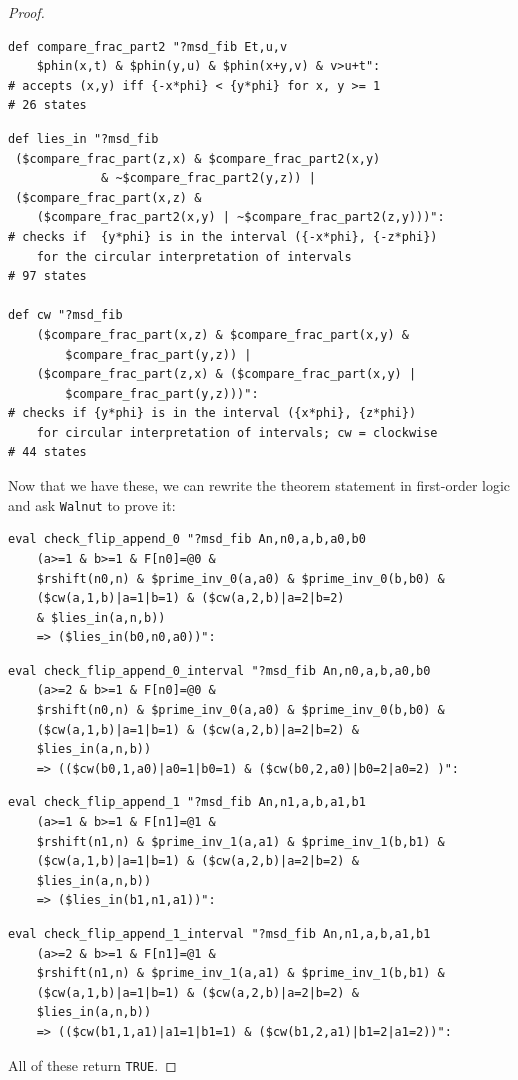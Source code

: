 \documentclass[10pt,a4paper]{amsart}
\begin{document}
\begin{proof}
\begin{verbatim}
def compare_frac_part2 "?msd_fib Et,u,v 
    $phin(x,t) & $phin(y,u) & $phin(x+y,v) & v>u+t":
# accepts (x,y) iff {-x*phi} < {y*phi} for x, y >= 1  
# 26 states
\end{verbatim}

\begin{verbatim}
def lies_in "?msd_fib  
 ($compare_frac_part(z,x) & $compare_frac_part2(x,y) 
             & ~$compare_frac_part2(y,z)) |
 ($compare_frac_part(x,z) & 
    ($compare_frac_part2(x,y) | ~$compare_frac_part2(z,y)))":
# checks if  {y*phi} is in the interval ({-x*phi}, {-z*phi}) 
    for the circular interpretation of intervals
# 97 states

def cw "?msd_fib 
    ($compare_frac_part(x,z) & $compare_frac_part(x,y) & 
        $compare_frac_part(y,z)) |
    ($compare_frac_part(z,x) & ($compare_frac_part(x,y) |   
        $compare_frac_part(y,z)))":
# checks if {y*phi} is in the interval ({x*phi}, {z*phi}) 
    for circular interpretation of intervals; cw = clockwise
# 44 states
\end{verbatim}

Now that we have these, we can rewrite the theorem statement in first-order logic and ask {\tt Walnut} to prove it:
\begin{verbatim}
eval check_flip_append_0 "?msd_fib An,n0,a,b,a0,b0 
    (a>=1 & b>=1 & F[n0]=@0 & 
    $rshift(n0,n) & $prime_inv_0(a,a0) & $prime_inv_0(b,b0) & 
    ($cw(a,1,b)|a=1|b=1) & ($cw(a,2,b)|a=2|b=2) 
    & $lies_in(a,n,b)) 
    => ($lies_in(b0,n0,a0))":
\end{verbatim}

\begin{verbatim}
eval check_flip_append_0_interval "?msd_fib An,n0,a,b,a0,b0 
    (a>=2 & b>=1 & F[n0]=@0 & 
    $rshift(n0,n) & $prime_inv_0(a,a0) & $prime_inv_0(b,b0) & 
    ($cw(a,1,b)|a=1|b=1) & ($cw(a,2,b)|a=2|b=2) & 
    $lies_in(a,n,b)) 
    => (($cw(b0,1,a0)|a0=1|b0=1) & ($cw(b0,2,a0)|b0=2|a0=2) )":
\end{verbatim}

\begin{verbatim}
eval check_flip_append_1 "?msd_fib An,n1,a,b,a1,b1 
    (a>=1 & b>=1 & F[n1]=@1 & 
    $rshift(n1,n) & $prime_inv_1(a,a1) & $prime_inv_1(b,b1) & 
    ($cw(a,1,b)|a=1|b=1) & ($cw(a,2,b)|a=2|b=2) & 
    $lies_in(a,n,b)) 
    => ($lies_in(b1,n1,a1))":
\end{verbatim}

\begin{verbatim}
eval check_flip_append_1_interval "?msd_fib An,n1,a,b,a1,b1 
    (a>=2 & b>=1 & F[n1]=@1 & 
    $rshift(n1,n) & $prime_inv_1(a,a1) & $prime_inv_1(b,b1) & 
    ($cw(a,1,b)|a=1|b=1) & ($cw(a,2,b)|a=2|b=2) & 
    $lies_in(a,n,b)) 
    => (($cw(b1,1,a1)|a1=1|b1=1) & ($cw(b1,2,a1)|b1=2|a1=2))":
\end{verbatim}
All of these return {\tt TRUE}.
\end{proof}
\end{document}
